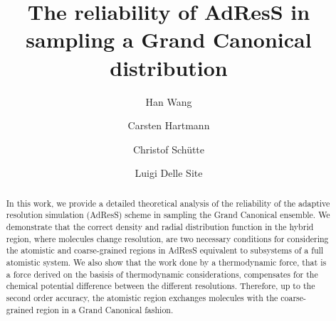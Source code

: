 \documentclass[aip,jcp,a4paper,reprint,onecolumn]{revtex4-1}
\begin{document}
\title{The reliability of AdResS in sampling a Grand Canonical distribution}
\author{Han Wang}
\author{Carsten Hartmann}
\author{Christof Sch\"utte}
\author{Luigi Delle Site}

\begin{abstract}
  In this work, we provide a detailed theoretical analysis of the
  reliability of the adaptive resolution simulation (AdResS) scheme in sampling the Grand Canonical
  ensemble. We demonstrate that the correct density and radial distribution
  function in the hybrid region, where molecules change resolution, are two necessary conditions for
  considering the atomistic and coarse-grained regions in AdResS equivalent to subsystems
  of a full atomistic system.  We also show that the
  work done by a thermodynamic force, that is a force derived on the basisis of thermodynamic considerations, compensates for the chemical
  potential difference between the different resolutions. Therefore,
  up to the second order accuracy, the atomistic region exchanges
  molecules with the coarse-grained region in a Grand Canonical
  fashion.
\end{abstract}

\maketitle
\end{document}
